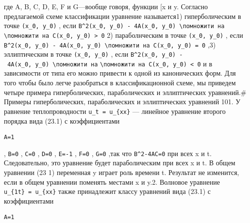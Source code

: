\documentclass[
  ukrainian,
]{article}
\begin{document}
где A, B, C, D, E, F и G---вообще говоря, функции {[}x и y. Согласно
предлагаемой схеме классификации уравнение называется1) гиперболическим
в точке \texttt{(x\_0,\ y\_0)} , если
\texttt{B\^{}2(x\_0,\ y\_0)\ -\ 4A(x\_0,\ y\_0)\ \textbackslash{}помножити\ на}
\texttt{\textbackslash{}помножити\ на\ C(x\_0,\ y\_0)\ \textgreater{}\ 0}
2) параболнческим в точке \texttt{(x\_0,\ y\_0)} , если
\texttt{B\^{}2(x\_0,\ y\_0)\ -\ 4A(x\_0,\ y\_0)\ \textbackslash{}помножити\ на\ C(x\_0,\ y\_0)\ =\ 0}
,3) эллиптическим в точке \texttt{(x\_0,\ y\_0)} , если
\texttt{B\^{}2(x\_0,\ y\_0)\ -\ 4A(x\_0,\ y\_0)\ \textbackslash{}помножити\ на}
\texttt{\textbackslash{}помножити\ на\ C(x\_0,\ y\_0)\ \textless{}\ 0} и
в зависимости от типа его можно привести к одной из канонических форм.
Для того чтобы было легче разобраться в классификационной схеме, мы
приведем четыре примера гиперболических, параболических и эллиптических
уравнений.\# Примеры гиперболических, параболических и эллиптических
уравнений 101. У равнение теплопроводности \texttt{u\_t\ =\ u\_\{xx\}}
--- линейное уравнение второго порядка вида (23.1) с коэффициентами

\begin{verbatim}
A=1
\end{verbatim}

, \texttt{B=0} , \texttt{C=0} , \texttt{D=0} , \texttt{E=-1} ,
\texttt{F=0} , \texttt{G=0} ,так что \texttt{B\^{}2-4AC=0} при всех x и
t. Следовательно, это уравнение будет параболическим при всех x и t. В
общем уравнении (23 1) переменная y играет роль времени t. Результат не
изменится, если в общем уравнении поменять местами x и y.2. Волновое
уравнение \texttt{u\_\{1t\}\ =\ u\_\{xx\}} также принадлежит классу
уравнений вида (23.1) с коэффициентами

\begin{verbatim}
A=1
\end{verbatim}
\end{document}
